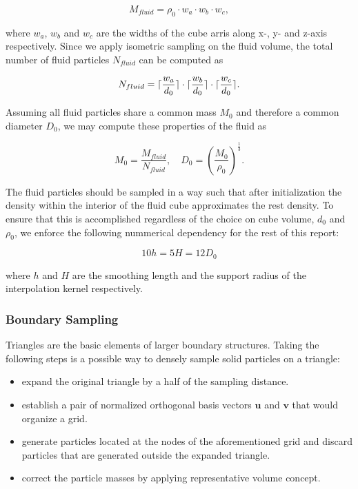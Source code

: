 \documentclass[
	11pt, 
	DIV10,
	ngerman,
	a4paper, 
	oneside, 
	headings=normal, 
	captions=tableheading,
	final, 
	numbers=noenddot
]{scrartcl}
\DeclarePairedDelimiter{\ceil}{\lceil}{\rceil}
\begin{document}
\begin{equation}
	\label{eq1}
	M_{fluid} = \rho_{0} \cdot w_{a} \cdot w_{b} \cdot w_{c},
\end{equation}

where $ w_{a} $, $ w_{b} $ and $ w_{c} $ are the widths of the cube arris along x-, y- and z-axis respectively. Since we apply isometric sampling on the fluid volume, the total number of fluid particles $ N_{fluid} $ can be computed as

\begin{equation}
	\label{eq2}
	N_{fluid} = \ceil{\frac{w_{a}}{d_{0}}} \cdot \ceil{\frac{w_{b}}{d_{0}}} \cdot \ceil{\frac{w_{c}}{d_{0}}}.
\end{equation}

Assuming all fluid particles share a common mass $ M_{0} $ and therefore a common diameter $ D_{0} $, we may compute these properties of the fluid as

\begin{equation}
	\label{eq3}
	M_{0} = \frac{M_{fluid}}{N_{fluid}}, \quad D_{0} = \left(\frac{M_{0}}{\rho_{0}}\right)^{\frac{1}{3}}.
\end{equation}

The fluid particles should be sampled in a way such that after initialization the density within the interior of the fluid cube approximates the rest density. To ensure that this is accomplished regardless of the choice on cube volume, $ d_{0} $ and $ \rho_{0} $, we enforce the following nummerical dependency for the rest of this report:

\begin{equation}
	\label{eq4}
	10h = 5H = 12D_{0}
\end{equation}

where $ h $ and $ H $ are the smoothing length and the support radius of the interpolation kernel respectively.

\subsubsection{Boundary Sampling}

Triangles are the basic elements of larger boundary structures. Taking the following steps is a possible way to densely sample solid particles on a triangle:

\begin{itemize}
    \item expand the original triangle by a half of the sampling distance.
    \item establish a pair of normalized orthogonal basis vectors $ \boldsymbol{u} $ and $ \boldsymbol{v} $ that would organize a grid.
    \item generate particles located at the nodes of the aforementioned grid and discard particles that are generated outside the expanded triangle.
    \item correct the particle masses by applying representative volume concept.
\end{itemize}
\end{document}
